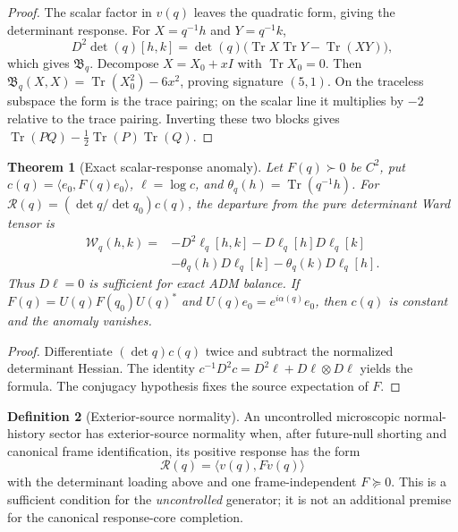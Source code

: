\documentclass[11pt]{article}
\newtheorem{theorem}{Theorem}[section]
\theoremstyle{definition}
\newtheorem{definition}[theorem]{Definition}
\theoremstyle{remark}
\newcommand{\Tr}{\operatorname{Tr}}
\begin{document}
\begin{proof}
The scalar factor in $v(q)$ leaves the quadratic form, giving the determinant
response.  For $X=q^{-1}h$ and $Y=q^{-1}k$,
\[
 D^2\det(q)[h,k]
 =\det(q)\bigl(\Tr X\Tr Y-\Tr(XY)\bigr),
\]
which gives $\mathfrak B_q$.  Decompose
$X=X_0+xI$ with $\Tr X_0=0$.  Then
$\mathfrak B_q(X,X)=\Tr(X_0^2)-6x^2$, proving signature $(5,1)$.
On the traceless subspace the form is the trace pairing; on the scalar line
it multiplies by $-2$ relative to the trace pairing.  Inverting these two
blocks gives $\Tr(PQ)-\tfrac12\Tr(P)\Tr(Q)$.
\end{proof}

\begin{theorem}[Exact scalar-response anomaly]
\label{thm:scalar-response-anomaly-master}
Let $F(q)\succ0$ be $C^2$, put
$c(q)=\langle e_0,F(q)e_0\rangle$, $\ell=\log c$, and
$\theta_q(h)=\Tr(q^{-1}h)$.  For
$\mathscr R(q)=(\det q/\det q_0)c(q)$, the departure from the pure determinant
Ward tensor is
\[
 \boxed{
 \begin{aligned}
 \mathcal W_q(h,k)={}&-D^2\ell_q[h,k]
 -D\ell_q[h]D\ell_q[k]\\
 &-\theta_q(h)D\ell_q[k]-\theta_q(k)D\ell_q[h].
 \end{aligned}}
\]
Thus $D\ell=0$ is sufficient for exact ADM balance.  If
$F(q)=U(q)F(q_0)U(q)^*$ and $U(q)e_0=e^{i\alpha(q)}e_0$, then $c(q)$ is
constant and the anomaly vanishes.
\end{theorem}

\begin{proof}
Differentiate $(\det q)c(q)$ twice and subtract the normalized determinant
Hessian.  The identity $c^{-1}D^2c=D^2\ell+D\ell\otimes D\ell$ yields the
formula.  The conjugacy hypothesis fixes the source expectation of $F$.
\end{proof}

\begin{definition}[Exterior-source normality]
An uncontrolled microscopic normal-history sector has exterior-source
normality when, after future-null shorting and canonical frame
identification, its positive response has the form
\[
 \mathscr R(q)=\langle v(q),Fv(q)\rangle
\]
with the determinant loading above and one frame-independent $F\succeq0$.
This is a sufficient condition for the \emph{uncontrolled} generator; it is
not an additional premise for the canonical response-core completion.
\end{definition}
\end{document}
